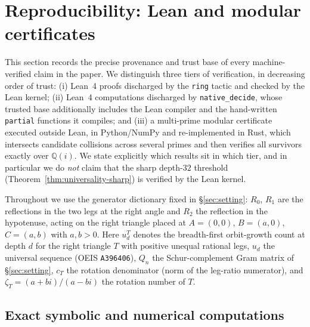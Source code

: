 \documentclass[11pt]{article}
\theoremstyle{plain}
\theoremstyle{definition}
\theoremstyle{remark}
\begin{document}

\section{Reproducibility: Lean and modular certificates}
\label{sec:reproduce}

This section records the precise provenance and trust base of every
machine-verified claim in the paper. We distinguish three tiers of
verification, in decreasing order of trust: (i) Lean~4 proofs discharged
by the \texttt{ring} tactic and checked by the Lean kernel; (ii) Lean~4
computations discharged by \texttt{native\_decide}, whose trusted base
additionally includes the Lean compiler and the hand-written
\texttt{partial} functions it compiles; and (iii) a multi-prime modular
certificate executed outside Lean, in Python/NumPy and re-implemented in
Rust, which intersects candidate collisions across several primes and
then verifies all survivors exactly over $\mathbb{Q}(i)$. We state
explicitly which results sit in which tier, and in particular we do
\emph{not} claim that the sharp depth-$32$ threshold
(Theorem~\ref{thm:universality-sharp}) is verified by the Lean kernel.

Throughout we use the generator dictionary fixed in
\S\ref{sec:setting}: $R_0$, $R_1$ are the reflections in the two legs at the
right angle and $R_2$ the reflection in the hypotenuse, acting on the
right triangle placed at $A=(0,0)$, $B=(a,0)$, $C=(a,b)$ with $a,b>0$.
Here $u_d^T$ denotes the breadth-first orbit-growth count at depth $d$
for the right triangle $T$ with positive unequal rational legs, $u_d$ the
universal sequence (OEIS \texttt{A396406}), $Q_n$ the Schur-complement
Gram matrix of \S\ref{sec:setting}, $c_T$ the rotation denominator (norm
of the leg-ratio numerator), and $\zeta_T = (a+bi)/(a-bi)$ the rotation
number of $T$.

\subsection{Exact symbolic and numerical computations}
\label{ssec:reproduce-exact}
\end{document}

